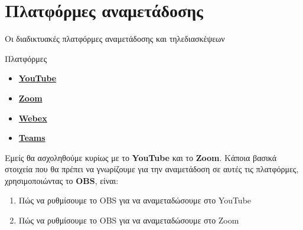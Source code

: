 \documentclass[aspectratio=169]{beamer}
\begin{document}
\section{Πλατφόρμες αναμετάδοσης}
\begin{frame}{Οι διαδικτυακές πλατφόρμες αναμετάδοσης και τηλεδιασκέψεων}
  \begin{block}{Πλατφόρμες}
    \begin{itemize}
      \item \textbf{\href{https://www.youtube.com/}{YouTube}}
      \item \textbf{\href{https://zoom.us/}{Zoom}}
      \item \textbf{\href{https://www.webex.com/}{Webex}}
      \item \textbf{\href{https://www.microsoft.com/el-gr/microsoft-teams/group-chat-software}{Teams}}
    \end{itemize}
  \end{block}
  Εμείς θα ασχοληθούμε κυρίως με το \textbf{YouTube} και το \textbf{Zoom}. Κάποια βασικά στοιχεία που θα
  πρέπει να γνωρίζουμε για την αναμετάδοση σε αυτές τις πλατφόρμες, χρησιμοποιώντας το \textbf{OBS}, είναι:
  \begin{enumerate}
    \item Πώς να ρυθμίσουμε το OBS για να αναμεταδώσουμε στο YouTube
    \item Πώς να ρυθμίσουμε το OBS για να αναμεταδώσουμε στο Zoom
  \end{enumerate}
\end{frame}
\end{document}
